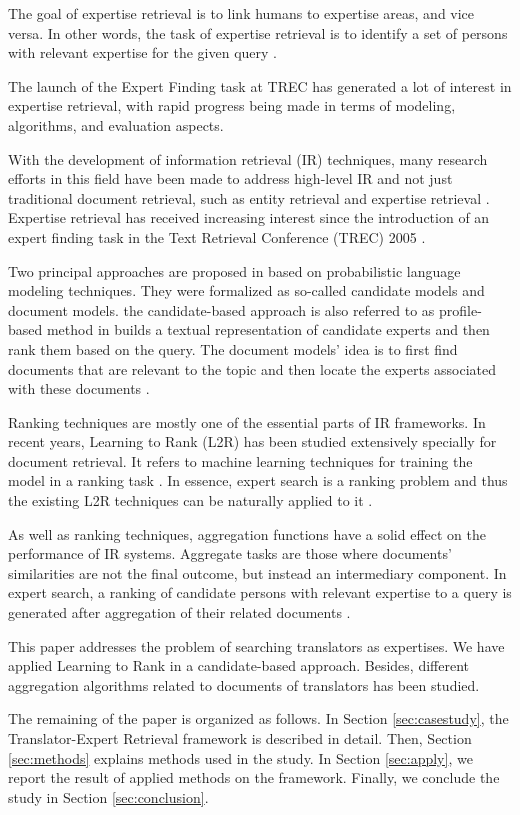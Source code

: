 The goal of expertise retrieval is to link humans to expertise areas, and vice versa. In other words, the task of expertise retrieval is to identify a set of persons with relevant expertise for the given query \cite{er} \cite{er-community-aware}.

The launch of the Expert Finding task at TREC has generated a lot of interest in expertise retrieval, with rapid progress being made in terms of modeling, algorithms, and evaluation aspects.

With the development of information retrieval (IR) techniques, many research efforts in this field have been made to address high-level IR and not just traditional document retrieval, such as entity retrieval and expertise retrieval \citep{er-sparse}. Expertise retrieval has received increasing interest since the introduction of an expert finding task in the Text Retrieval Conference (TREC) 2005 \cite{trec2005} \cite{er-community-aware}.

Two principal approaches are proposed in \cite{trec2005} based on probabilistic language modeling techniques. They were formalized as so-called candidate models and document models. the candidate-based approach is also referred to as
profile-based method in builds a textual representation of candidate experts and then rank them based on the query. The document models' idea is to first find documents that are relevant to the topic and then locate the experts associated with these documents \cite{er}.

Ranking techniques are mostly one of the essential parts of IR frameworks. In recent years, Learning to Rank (L2R) has been studied extensively specially for document retrieval. It refers to machine learning techniques for training the model in a ranking task \cite{er}. In essence, expert search is a ranking problem and thus the existing L2R techniques can be naturally applied to it \cite{l2r-intro}.

As well as ranking techniques, aggregation functions have a solid effect on the performance of IR systems. Aggregate tasks are those where documents' similarities are not
the final outcome, but instead an intermediary component. In expert search, a ranking of candidate persons with relevant expertise to a query is generated after aggregation of their related documents \citep{agg-learning}.

This paper addresses the problem of searching translators as expertises. We have applied Learning to Rank in a candidate-based approach. Besides, different aggregation algorithms related to documents of translators has been studied.

The remaining of the paper is organized as follows. In Section \ref{sec:casestudy}, the Translator-Expert Retrieval framework is described in detail. Then, Section \ref{sec:methods} explains methods used in the study. In Section \ref{sec:apply}, we report the result of applied methods on the framework. Finally, we conclude the study in Section \ref{sec:conclusion}.
